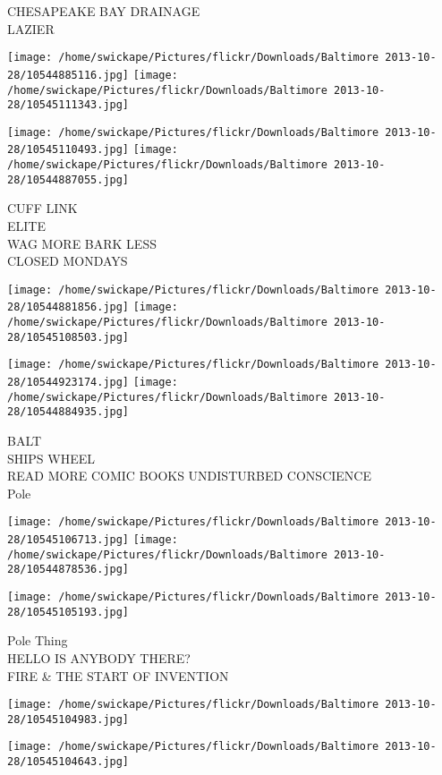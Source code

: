 \documentclass[10pt,letterpaper]{article}
\begin{document}
CHESAPEAKE BAY DRAINAGE\\
LAZIER
\pagebreak

\texttt{[image: /home/swickape/Pictures/flickr/Downloads/Baltimore 2013-10-28/10544885116.jpg]}
\texttt{[image: /home/swickape/Pictures/flickr/Downloads/Baltimore 2013-10-28/10545111343.jpg]}

\texttt{[image: /home/swickape/Pictures/flickr/Downloads/Baltimore 2013-10-28/10545110493.jpg]}
\texttt{[image: /home/swickape/Pictures/flickr/Downloads/Baltimore 2013-10-28/10544887055.jpg]}

CUFF LINK\\
ELITE\\
WAG MORE BARK LESS\\
CLOSED MONDAYS
\pagebreak

\texttt{[image: /home/swickape/Pictures/flickr/Downloads/Baltimore 2013-10-28/10544881856.jpg]}
\texttt{[image: /home/swickape/Pictures/flickr/Downloads/Baltimore 2013-10-28/10545108503.jpg]}

\texttt{[image: /home/swickape/Pictures/flickr/Downloads/Baltimore 2013-10-28/10544923174.jpg]}
\texttt{[image: /home/swickape/Pictures/flickr/Downloads/Baltimore 2013-10-28/10544884935.jpg]}

BALT\\
SHIPS WHEEL\\
READ MORE COMIC BOOKS UNDISTURBED CONSCIENCE\\
Pole
\pagebreak

\texttt{[image: /home/swickape/Pictures/flickr/Downloads/Baltimore 2013-10-28/10545106713.jpg]}
\texttt{[image: /home/swickape/Pictures/flickr/Downloads/Baltimore 2013-10-28/10544878536.jpg]}

\vspace{0.25in}
\texttt{[image: /home/swickape/Pictures/flickr/Downloads/Baltimore 2013-10-28/10545105193.jpg]}

Pole Thing\\
HELLO IS ANYBODY THERE?\\
FIRE \& THE START OF INVENTION
\pagebreak

\texttt{[image: /home/swickape/Pictures/flickr/Downloads/Baltimore 2013-10-28/10545104983.jpg]}

\vspace{0.25in}
\texttt{[image: /home/swickape/Pictures/flickr/Downloads/Baltimore 2013-10-28/10545104643.jpg]}
\end{document}
